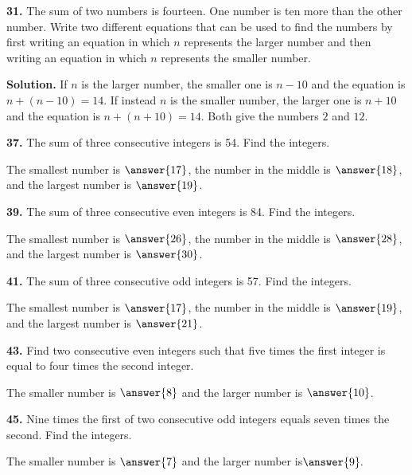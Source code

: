 \documentclass{ximera}
\begin{document}
\begin{problem}
\textbf{31.} The sum of two numbers is fourteen. One number is ten more than the other number.
  Write two different equations that can be used to find the numbers by first writing an
  equation in which $n$ represents the larger number and then writing an equation in
  which $n$ represents the smaller number.

\begin{hint}
\textbf{Solution.} If $n$ is the larger number, the smaller one is $n-10$ and the equation is $n+(n-10)=14$. If instead $n$ is the smaller number, the larger one is $n+10$ and the equation is $n+(n+10)=14$. Both give the numbers $2$ and $12$.
\end{hint}
\end{problem}

\begin{problem}
\textbf{37.} The sum of three consecutive integers is 54. Find the integers.

The smallest number is $\answer{17}$, the number in the middle is $\answer{18}$, and the largest number is $\answer{19}$. \end{problem}

\begin{problem}
\textbf{39.} The sum of three consecutive even integers is 84. Find the integers.

The smallest number is $\answer{26}$, the number in the middle is $\answer{28}$, and the largest number is $\answer{30}$. \end{problem}

\begin{problem}
\textbf{41.} The sum of three consecutive odd integers is 57. Find the integers.

The smallest number is $\answer{17}$, the number in the middle is $\answer{19}$, and the largest number is $\answer{21}$. \end{problem}

\begin{problem}
\textbf{43.} Find two consecutive even integers such that five times the first integer is
  equal to four times the second integer.

The smaller number is $\answer{8}$ and the larger number is $\answer{10}$. \end{problem}

\begin{problem}
\textbf{45.} Nine times the first of two consecutive odd integers equals seven times the
  second. Find the integers.

The smaller number is $\answer{7} $ and the larger number is$ \answer{9}.$
\end{problem}
\end{document}
